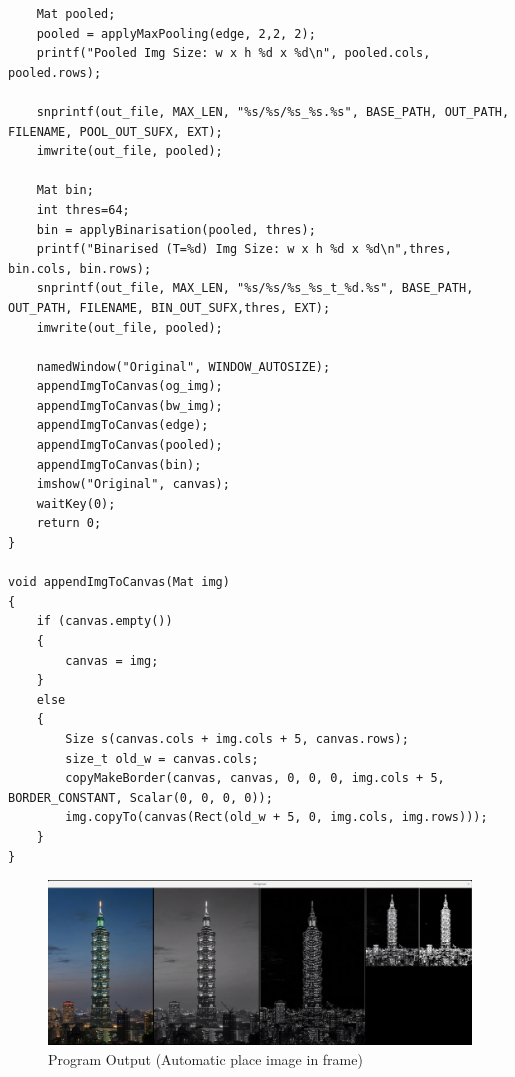 \documentclass[12pt,a4paper]{report}
\begin{document}
\begin{lstlisting}
    Mat pooled;
    pooled = applyMaxPooling(edge, 2,2, 2);
    printf("Pooled Img Size: w x h %d x %d\n", pooled.cols, pooled.rows);

    snprintf(out_file, MAX_LEN, "%s/%s/%s_%s.%s", BASE_PATH, OUT_PATH, FILENAME, POOL_OUT_SUFX, EXT);
    imwrite(out_file, pooled);

    Mat bin;
    int thres=64;
    bin = applyBinarisation(pooled, thres);
    printf("Binarised (T=%d) Img Size: w x h %d x %d\n",thres, bin.cols, bin.rows);
    snprintf(out_file, MAX_LEN, "%s/%s/%s_%s_t_%d.%s", BASE_PATH, OUT_PATH, FILENAME, BIN_OUT_SUFX,thres, EXT);
    imwrite(out_file, pooled);

    namedWindow("Original", WINDOW_AUTOSIZE);
    appendImgToCanvas(og_img);
    appendImgToCanvas(bw_img);
    appendImgToCanvas(edge);
    appendImgToCanvas(pooled);
    appendImgToCanvas(bin);
    imshow("Original", canvas);
    waitKey(0);
    return 0;
}

void appendImgToCanvas(Mat img)
{
    if (canvas.empty())
    {
        canvas = img;
    }
    else
    {
        Size s(canvas.cols + img.cols + 5, canvas.rows);
        size_t old_w = canvas.cols;
        copyMakeBorder(canvas, canvas, 0, 0, 0, img.cols + 5, BORDER_CONSTANT, Scalar(0, 0, 0, 0));
        img.copyTo(canvas(Rect(old_w + 5, 0, img.cols, img.rows)));
    }
}

\end{lstlisting}
\begin{figure}[!htb]
  \centering
  \includegraphics[width=1\linewidth]{program.png}
  \caption{Program Output (Automatic place image in frame)}
\end{figure}
\clearpage
\end{document}
